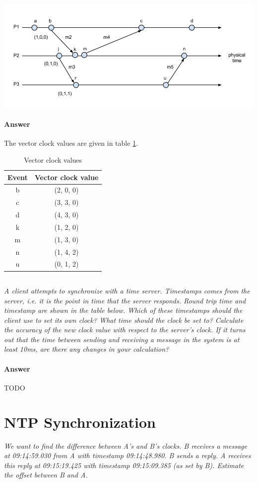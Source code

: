 \documentclass{article}
\newcommand{\question}[1]{\subsection{}\textit{#1}\bigskip}
\newcommand{\singlequestion}[1]{\textit{#1}\bigskip}
\newcommand{\answer}{\paragraph{Answer}}
\begin{document}
\includegraphics[width=\textwidth]{images/T3-2.png}

\answer
The vector clock values are given in table \ref{table:vector-clock-values}.

\begin{table}[H]
    \centering
    \begin{tabular}{c | c}
        Event & Vector clock value \\
        \hline
        b & (2, 0, 0) \\
        c & (3, 3, 0) \\
        d & (4, 3, 0) \\
        k & (1, 2, 0) \\
        m & (1, 3, 0) \\
        n & (1, 4, 2) \\
        u & (0, 1, 2) \\
    \end{tabular}
    \caption{Vector clock values}
    \label{table:vector-clock-values}
\end{table}

\question{A client attempts to synchronize with a time server. Timestamps comes from the server, i.e. it is the point in time that the server responds. Round trip time and timestamp are shown in the table below. Which of these timestamps should the client use to set its own clock? What time should the clock be set to? Calculate the accuracy of the new clock value with respect to the server's clock. If it turns out that the time between sending and receiving a message in the system is at least 10ms, are there any changes in your calculation?}

\answer
TODO

\section{NTP Synchronization}

\singlequestion{We want to find the difference between A's and B's clocks. B receives a message at 09:14:59.030 from A with timestamp 09:14:48.980. B sends a reply. A receives this reply at 09:15:19.425 with timestamp 09:15:09.385 (as set by B). Estimate the offset between B and A.}
\end{document}
